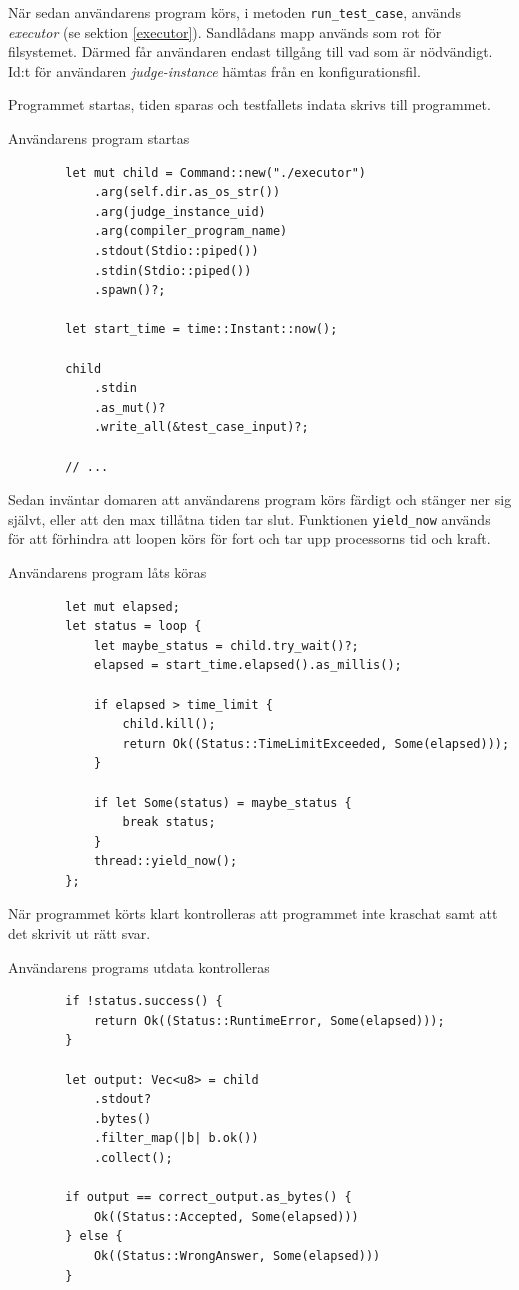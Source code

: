 \documentclass{article}
\begin{document}
När sedan användarens program körs, i metoden \texttt{run\_test\_case}, används
\textit{executor} (se sektion \ref{executor}). Sandlådans mapp används som rot
för filsystemet. Därmed får användaren endast tillgång till vad som är
nödvändigt. Id:t för användaren \textit{judge-instance} hämtas från en
konfigurationsfil.

Programmet startas, tiden sparas
och testfallets indata skrivs till programmet.

\begin{listing}[H]
	\caption{Användarens program startas}
	\begin{verbatim}
		let mut child = Command::new("./executor")
			.arg(self.dir.as_os_str())
			.arg(judge_instance_uid)
			.arg(compiler_program_name)
			.stdout(Stdio::piped())
			.stdin(Stdio::piped())
			.spawn()?;

		let start_time = time::Instant::now();

		child
			.stdin
			.as_mut()?
			.write_all(&test_case_input)?;

		// ...
	\end{verbatim}
\end{listing}

Sedan inväntar domaren att användarens program körs färdigt och stänger ner sig
självt, eller att den max tillåtna tiden tar slut. Funktionen
\texttt{yield\_now} används för att förhindra att loopen körs för fort och tar
upp processorns tid och kraft.

\begin{listing}[H]
	\caption{Användarens program låts köras}
	\begin{verbatim}
		let mut elapsed;
		let status = loop {
			let maybe_status = child.try_wait()?;
			elapsed = start_time.elapsed().as_millis();

			if elapsed > time_limit {
				child.kill();
				return Ok((Status::TimeLimitExceeded, Some(elapsed)));
			}

			if let Some(status) = maybe_status {
				break status;
			}
			thread::yield_now();
		};
	\end{verbatim}
\end{listing}

När programmet körts klart kontrolleras att programmet inte kraschat samt att
det skrivit ut rätt svar.

\begin{listing}[H]
	\caption{Användarens programs utdata kontrolleras}
	\begin{verbatim}
		if !status.success() {
			return Ok((Status::RuntimeError, Some(elapsed)));
		}

		let output: Vec<u8> = child
			.stdout?
			.bytes()
			.filter_map(|b| b.ok())
			.collect();

		if output == correct_output.as_bytes() {
			Ok((Status::Accepted, Some(elapsed)))
		} else {
			Ok((Status::WrongAnswer, Some(elapsed)))
		}
	\end{verbatim}
\end{listing}
\end{document}
